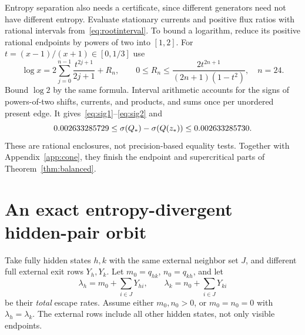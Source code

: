 Entropy separation also needs a certificate, since different generators need not have different entropy. Evaluate stationary currents and positive flux ratios with rational intervals from~\eqref{eq:rootinterval}. To bound a logarithm, reduce its positive rational endpoints by powers of two into $[1,2]$. For $t=(x-1)/(x+1)\in[0,1/3]$ use
\begin{equation}
 \log x=2\sum_{j=0}^{n-1}\frac{t^{2j+1}}{2j+1}+R_n,\qquad
 0\le R_n\le\frac{2t^{2n+1}}{(2n+1)(1-t^2)},\quad n=24.\label{eq:logbound}
\end{equation}
Bound $\log2$ by the same formula. Interval arithmetic accounts for the signs of powers-of-two shifts, currents, and products, and sums once per unordered present edge. It gives~\eqref{eq:sig1}--\eqref{eq:sig2} and
\begin{equation}
 0.002633285729\le\sigma(Q_*)-\sigma(Q(z_*))\le0.002633285730.
\end{equation}
These are rational enclosures, not precision-based equality tests. Together with Appendix~\ref{app:cone}, they finish the endpoint and supercritical parts of Theorem~\ref{thm:balanced}.

\section{An exact entropy-divergent hidden-pair orbit}\label{app:pair}
Take fully hidden states $h,k$ with the same external neighbor set $J$, and different full external exit rows $Y_h,Y_k$. Let $m_0=q_{hk}$, $n_0=q_{kh}$, and let
\begin{equation}
 \lambda_h=m_0+\sum_{i\in J}Y_{hi},\qquad
 \lambda_k=n_0+\sum_{i\in J}Y_{ki}
\end{equation}
be their \emph{total} escape rates. Assume either $m_0,n_0>0$, or $m_0=n_0=0$ with $\lambda_h=\lambda_k$. The external rows include all other hidden states, not only visible endpoints.

